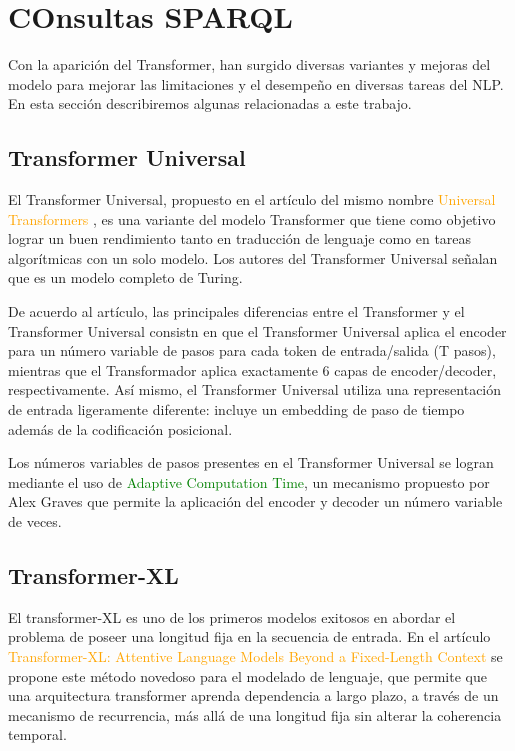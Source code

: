 \documentclass[conference]{IEEEtran}
\begin{document}
\section{COnsultas SPARQL}
Con la aparici\'on del Transformer, han surgido diversas variantes y mejoras del modelo para  mejorar las limitaciones  y el desempe\~no en diversas tareas del NLP. En esta secci\'on describiremos algunas relacionadas a este trabajo.

\subsection{Transformer Universal}

El Transformer Universal, propuesto en el art\'iculo del mismo nombre \textcolor{orange}{Universal Transformers} \cite{b5}, es una variante del modelo Transformer que tiene como objetivo lograr un buen rendimiento tanto en traducci\'on de lenguaje como en tareas algor\'itmicas con un solo modelo. Los autores del Transformer Universal se\~nalan que es un modelo completo de Turing. 

\vspace{0.2cm}

De acuerdo al art\'iculo, las principales diferencias entre el Transformer y el Transformer Universal consistn en que el Transformer Universal aplica el encoder para un n\'umero variable de pasos para cada token de entrada/salida (T pasos), mientras que el Transformador aplica exactamente $6$ capas de encoder/decoder, respectivamente. As\'i mismo, el Transformer Universal utiliza una representaci\'on de entrada ligeramente diferente: incluye un embedding de paso de tiempo adem\'as de la codificaci\'on posicional.

\vspace{0.2cm}

Los n\'umeros variables de pasos presentes en el Transformer Universal se logran mediante el uso de \textcolor{green}{Adaptive Computation Time}, un mecanismo propuesto por Alex Graves \cite{b6} que permite la aplicaci\'on del encoder y decoder un n\'umero variable de veces.
	
\vspace{0.2cm}

\subsection{Transformer-XL}

El transformer-XL es uno de los primeros modelos exitosos en abordar el problema de poseer una longitud fija en la secuencia de entrada. En el art\'iculo \textcolor{orange}{Transformer-XL: Attentive Language Models Beyond a Fixed-Length Context} \cite{b7} se propone este m\'etodo novedoso para el modelado de lenguaje, que permite que una arquitectura transformer aprenda dependencia a largo plazo, a trav\'es de un mecanismo de recurrencia, m\'as all\'a de una longitud fija sin alterar la coherencia temporal.
\end{document}
